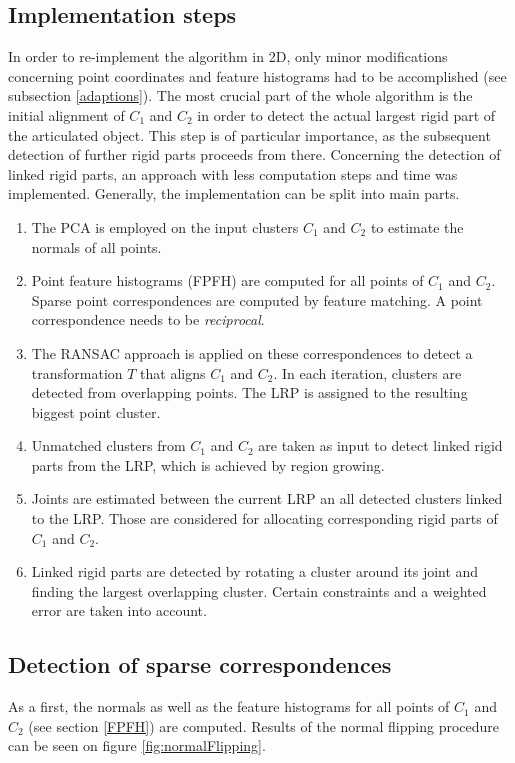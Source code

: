 \subsection{Implementation steps}
In order to re-implement the algorithm in 2D, only minor modifications concerning point coordinates and feature histograms had to be accomplished (see subsection \ref{adaptions}). The most crucial part of the whole algorithm is the initial alignment of $C_1$ and $C_2$ in order to detect the actual largest rigid part of the articulated object. This step is of particular importance, as the subsequent detection of further rigid parts proceeds from there. Concerning the detection of linked rigid parts, an approach with less computation steps and time was implemented. Generally, the implementation can be split into main parts.
\begin{enumerate}
	\item The PCA is employed on the input clusters $C_1$ and $C_2$ to estimate the normals of all points.
	\item Point feature histograms (FPFH) are computed for all points of $C_1$ and $C_2$. Sparse point correspondences are computed by feature matching. A point correspondence needs to be \textit{reciprocal}.
	\item The RANSAC approach is applied on these correspondences to detect a transformation $T$ that aligns $C_1$ and $C_2$. In each iteration, clusters are detected from overlapping points. The LRP is assigned to the resulting biggest point cluster.
	\item Unmatched clusters from $C_1$ and $C_2$ are taken as input to detect linked rigid parts from the LRP, which is achieved by region growing.
	\item Joints are estimated between the current LRP an all detected clusters linked to the LRP. Those are considered for allocating corresponding rigid parts of $C_1$ and $C_2$.
	\item Linked rigid parts are detected by rotating a cluster around its joint and finding the largest overlapping cluster. Certain constraints and a weighted error are taken into account.
\end{enumerate}

\subsection{Detection of sparse correspondences}
\label{correspondences}
As a first, the normals as well as the feature histograms for all points of $C_1$ and $C_2$ (see section \ref{FPFH}) are computed. Results of the normal flipping procedure can be seen on figure \ref{fig:normalFlipping}.

